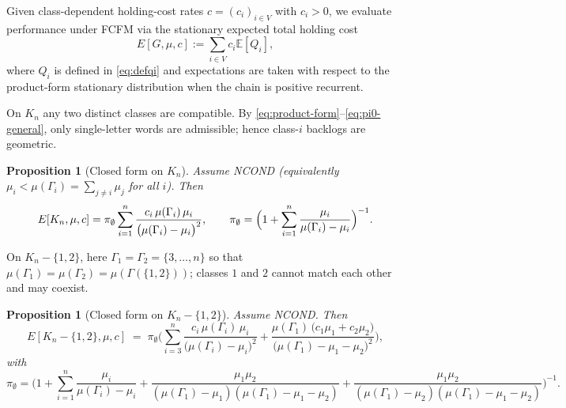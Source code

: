\documentclass[11pt]{article}
\newtheorem{proposition}[theorem]{Proposition}
\begin{document}
{Given class-dependent holding-cost rates $c=(c_i)_{i\in V}$ with $c_i>0$, we evaluate performance under \textsc{FCFM} via the stationary expected total holding cost
\begin{equation}\label{eq:def-cost}
E[G,\mu,c]:=\sum_{i\in V} c_i\mathbb{E}[Q_i],
\end{equation}
where $Q_i$ is defined in \eqref{eq:defqi} and expectations are taken with respect to the product-form stationary distribution when the chain is positive recurrent.

On $K_n$ any two distinct classes are compatible. By \eqref{eq:product-form}–\eqref{eq:pi0-general}, only single-letter words are admissible; hence class-$i$ backlogs are geometric.

\begin{proposition}[Closed form on $K_n$]\label{prop:Kn}
Assume \textsc{NCOND} (equivalently $\mu_i<\mu(\Gamma_i)=\sum_{j\neq i}\mu_j$ for all $i$).
Then
\begin{equation}\label{eq:KnCost}
E[K_n,\mu,c]=\pi_{\emptyset}\sum_{i=1}^n\frac{c_i\,\mu(\Gamma_i)\,\mu_i}{\bigl(\mu(\Gamma_i)-\mu_i\bigr)^2},
\qquad
\pi_{\emptyset}
=\Bigl(1+\sum_{i=1}^n \frac{\mu_i}{\mu(\Gamma_i)-\mu_i}\Bigr)^{-1}.
\end{equation}
\end{proposition}

On $K_n-\{1,2\}$, here $\Gamma_1=\Gamma_2=\{3,\dots,n\}$ so that $\mu(\Gamma_1)=\mu(\Gamma_2)=\mu(\Gamma(\{1,2\}))$; classes $1$ and $2$ cannot match each other and may coexist.

\begin{proposition}[Closed form on $K_n-\{1,2\}$]\label{prop:Kn12}
Assume \textsc{NCOND}. Then
\begin{equation}\label{eq:KnMinusCost}
E[K_n-\{1,2\},\mu,c]
\;=\;
\pi_{\emptyset}\Biggl(
\sum_{i=3}^n \frac{c_i\,\mu(\Gamma_i)\,\mu_i}{\bigl(\mu(\Gamma_i)-\mu_i\bigr)^2}+\frac{\mu(\Gamma_1)\,\bigl(c_1\mu_1+c_2\mu_2\bigr)}
{\bigl(\mu(\Gamma_1)-\mu_1-\mu_2\bigr)^2}
\Biggr),
\end{equation}
with
\begin{equation}\label{eq:pi0KnMinus}
\pi_{\emptyset}
=\Biggl(1+\sum_{i=1}^n \frac{\mu_i}{\mu(\Gamma_i)-\mu_i}
+\frac{\mu_1\mu_2}{(\mu(\Gamma_1)-\mu_1)(\mu(\Gamma_1)-\mu_1-\mu_2)}
+\frac{\mu_1\mu_2}{(\mu(\Gamma_1)-\mu_2)(\mu(\Gamma_1)-\mu_1-\mu_2)}\Biggr)^{-1}.
\end{equation}
\end{proposition}

}
\end{document}
